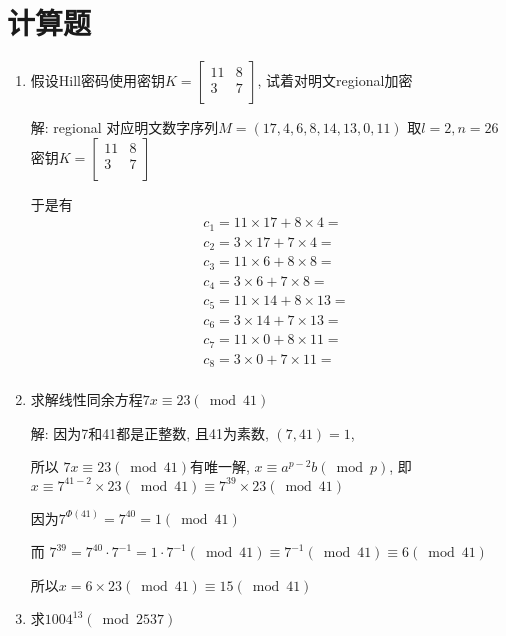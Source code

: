 \documentclass[UTF8]{ctexart}
\begin{document}
\section{计算题}
\begin{enumerate}
    \item 假设Hill密码使用密钥$K=\left[ \begin{matrix}
        11 &8\\
        3 &7\\
    \end{matrix}\right]$, 试着对明文regional加密

    解: regional 对应明文数字序列$M=(17, 4, 6, 8, 14, 13, 0, 11)$
    取$l=2, n=26$
    密钥$K=\left[ \begin{matrix}
        11 &8\\
        3 &7\\
    \end{matrix}\right]$

    于是有
    $$
    \begin{aligned}
        &c_1=11\times 17+8\times 4=\\
        &c_2=3\times 17+7\times 4=\\
        &c_3=11\times 6+8\times 8=\\
        &c_4=3\times 6+7\times 8=\\
        &c_5=11\times 14+8\times 13=\\
        &c_6=3\times 14+7\times 13=\\
        &c_7=11\times 0+8\times 11=\\
        &c_8=3\times 0+7\times 11=\\
    \end{aligned}
    $$

    \item 求解线性同余方程$7x\equiv 23(\bmod 41)$

    解: 因为7和41都是正整数, 且41为素数, $(7, 41)=1$,

    所以 $7x\equiv 23(\bmod 41)$有唯一解, $x\equiv a^{p-2}b(\bmod p)$, 即$x\equiv 7^{41-2}\times23(\bmod 41)\equiv 7^{39}\times 23(\bmod 41)$

    因为$7^{\Phi(41)}=7^{40}=1(\bmod 41)$

    而 $7^{39}=7^{40}\cdot 7^{-1}=1\cdot 7^{-1}(\bmod  41)\equiv 7^{-1}(\bmod 41)\equiv 6(\bmod 41)$

    所以$x=6\times 23(\bmod 41)\equiv 15(\bmod 41)$

    \item 求$1004^{13}(\bmod 2537)$


\end{enumerate}
\end{document}
